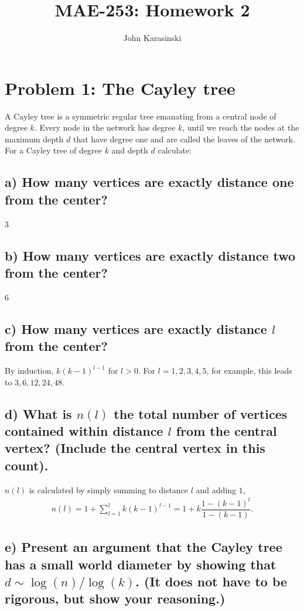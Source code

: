 \documentclass{tufte-handout}
\begin{document}
\title{MAE-253: Homework 2}
\author[John Karasinski]{John Karasinski}
\maketitle%

\section{Problem 1: The Cayley tree}
A Cayley tree is a symmetric regular tree emanating from a central node of degree $k$. Every node in the network has degree $k$, until we reach the nodes at the maximum depth $d$ that have degree one and are called the leaves of the network. For a Cayley tree of degree $k$ and depth $d$ calculate:

\subsection{a) How many vertices are exactly distance one from the center?}
3

\subsection{b) How many vertices are exactly distance two from the center?}
6

\subsection{c) How many vertices are exactly distance $l$ from the center?}
By induction, $k (k-1)^{l-1}$ for $l > 0$. For $l = 1, 2, 3, 4, 5$, for example, this leads to $3, 6, 12, 24, 48$.

\subsection{d) What is $n(l)$ the total number of vertices contained within distance $l$ from the central vertex? (Include the central vertex in this count).}

$n(l)$ is calculated by simply summing to distance $l$ and adding $1$,
\begin{align*}
n(l) = 1 + \sum_{l=1}^l k (k-1)^{l-1} = 1 + k \dfrac{1-(k-1)^l}{1-(k-1)}.
\end{align*}

\subsection{e) Present an argument that the Cayley tree has a small world diameter by showing that $d \sim \log{(n)}/\log{(k)}$. (It does not have to be rigorous, but show your reasoning.)}
\end{document}
